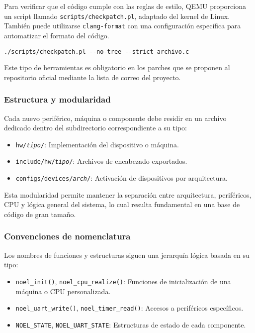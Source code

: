 Para verificar que el código cumple con las reglas de estilo, QEMU proporciona un script llamado \texttt{scripts/checkpatch.pl}, adaptado del kernel de Linux. También puede utilizarse \texttt{clang-format} con una configuración específica para automatizar el formato del código.

\begin{verbatim}
./scripts/checkpatch.pl --no-tree --strict archivo.c
\end{verbatim}

Este tipo de herramientas es obligatorio en los parches que se proponen al repositorio oficial mediante la lista de correo del proyecto.

\subsubsection*{Estructura y modularidad}

Cada nuevo periférico, máquina o componente debe residir en un archivo dedicado dentro del subdirectorio correspondiente a su tipo:

\begin{itemize}
  \item \texttt{hw/\emph{tipo}/}: Implementación del dispositivo o máquina.
  \item \texttt{include/hw/\emph{tipo}/}: Archivos de encabezado exportados.
  \item \texttt{configs/devices/\emph{arch}/}: Activación de dispositivos por arquitectura.
\end{itemize}

Esta modularidad permite mantener la separación entre arquitectura, periféricos, CPU y lógica general del sistema, lo cual resulta fundamental en una base de código de gran tamaño.

\subsubsection*{Convenciones de nomenclatura}

Los nombres de funciones y estructuras siguen una jerarquía lógica basada en su tipo:

\begin{itemize}
  \item \texttt{noel\_init()}, \texttt{noel\_cpu\_realize()}: Funciones de inicialización de una máquina o CPU personalizada.
  \item \texttt{noel\_uart\_write()}, \texttt{noel\_timer\_read()}: Accesos a periféricos específicos.
  \item \texttt{NOEL\_STATE}, \texttt{NOEL\_UART\_STATE}: Estructuras de estado de cada componente.
\end{itemize}

